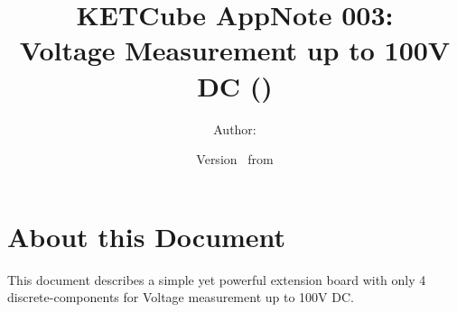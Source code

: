   




\title{\UWBLogo KETCube AppNote 003:\\ Voltage Measurement up to 100V DC (\vhCurrentVersion)}

\author{Author: \vhListAllAuthorsLongWithAbbrev}
\date{Version \vhCurrentVersion\ from \vhCurrentDate}

  




  


\section*{About this Document}


This document describes a simple yet powerful extension board with only 4 discrete-components for Voltage measurement up to 100V DC.


\setcounter{tocdepth}{1}
\tableofcontents
\clearpage

\listoffigures
\listoftables
\begin{versionhistory}
\end{versionhistory}
\setcounter{table}{0}

